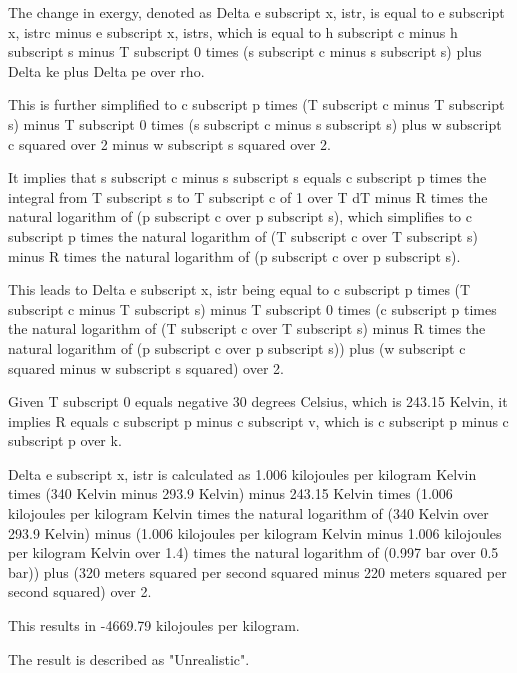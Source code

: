 The change in exergy, denoted as Delta e subscript x, istr, is equal to e subscript x, istrc minus e subscript x, istrs, which is equal to h subscript c minus h subscript s minus T subscript 0 times (s subscript c minus s subscript s) plus Delta ke plus Delta pe over rho.

This is further simplified to c subscript p times (T subscript c minus T subscript s) minus T subscript 0 times (s subscript c minus s subscript s) plus w subscript c squared over 2 minus w subscript s squared over 2.

It implies that s subscript c minus s subscript s equals c subscript p times the integral from T subscript s to T subscript c of 1 over T dT minus R times the natural logarithm of (p subscript c over p subscript s), which simplifies to c subscript p times the natural logarithm of (T subscript c over T subscript s) minus R times the natural logarithm of (p subscript c over p subscript s).

This leads to Delta e subscript x, istr being equal to c subscript p times (T subscript c minus T subscript s) minus T subscript 0 times (c subscript p times the natural logarithm of (T subscript c over T subscript s) minus R times the natural logarithm of (p subscript c over p subscript s)) plus (w subscript c squared minus w subscript s squared) over 2.

Given T subscript 0 equals negative 30 degrees Celsius, which is 243.15 Kelvin, it implies R equals c subscript p minus c subscript v, which is c subscript p minus c subscript p over k.

Delta e subscript x, istr is calculated as 1.006 kilojoules per kilogram Kelvin times (340 Kelvin minus 293.9 Kelvin) minus 243.15 Kelvin times (1.006 kilojoules per kilogram Kelvin times the natural logarithm of (340 Kelvin over 293.9 Kelvin) minus (1.006 kilojoules per kilogram Kelvin minus 1.006 kilojoules per kilogram Kelvin over 1.4) times the natural logarithm of (0.997 bar over 0.5 bar)) plus (320 meters squared per second squared minus 220 meters squared per second squared) over 2.

This results in -4669.79 kilojoules per kilogram.

The result is described as "Unrealistic".